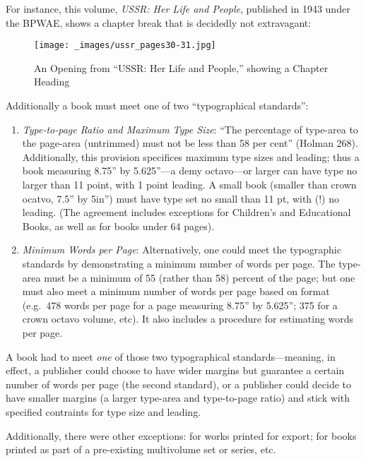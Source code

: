 \documentclass[
  12pt,
]{article}
\begin{document}
For instance, this volume, \emph{USSR: Her Life and People}, published
in 1943 under the BPWAE, shows a chapter break that is decidedly not
extravagant:

\par\begin{figure}\centering\texttt{[image: \_images/ussr\_pages30-31.jpg]}\caption{An Opening from “USSR: Her Life and People,” showing a Chapter Heading}\end{figure}

Additionally a book must meet one of two ``typographical standards'':

\begin{enumerate}
\def\labelenumi{\arabic{enumi}.}
\item
  \emph{Type-to-page Ratio and Maximum Type Size}: ``The percentage of
  type-area to the page-area (untrimmed) must not be less than 58 per
  cent'' (Holman 268). Additionally, this provision specifices maximum
  type sizes and leading; thus a book measuring 8.75'' by 5.625''---a
  demy octavo---or larger can have type no larger than 11 point, with 1
  point leading. A small book (smaller than crown ocatvo, 7.5'' by
  5in'') must have type set no small than 11 pt, with (!) no leading.
  (The agreement includes exceptions for Children's and Educational
  Books, as well as for books under 64 pages).
\item
  \emph{Minimum Words per Page}: Alternatively, one could meet the
  typographic standards by demonstrating a minimum number of words per
  page. The type-area must be a minimum of 55 (rather than 58) percent
  of the page; but one must also meet a minimum number of words per page
  based on format (e.g.~478 words per page for a page measuring 8.75''
  by 5.625''; 375 for a crown octavo volume, etc). It also includes a
  procedure for estimating words per page.
\end{enumerate}

A book had to meet \emph{one} of those two typographical
standards---meaning, in effect, a publisher could choose to have wider
margins but guarantee a certain number of words per page (the second
standard), or a publisher could decide to have smaller margins (a larger
type-area and type-to-page ratio) and stick with specified contraints
for type size and leading.

Additionally, there were other exceptions: for works printed for export;
for books printed as part of a pre-existing multivolume set or series,
etc.
\end{document}
